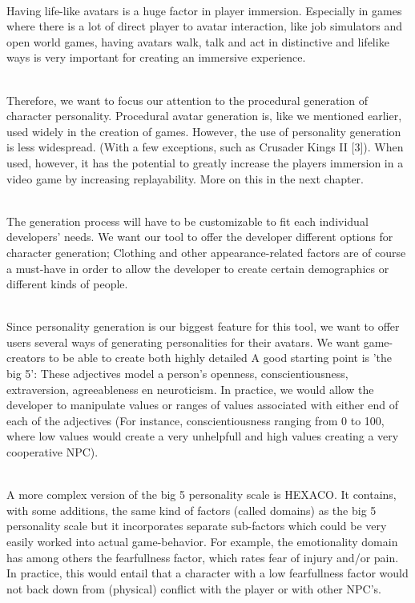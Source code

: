 \documentclass[11pt]{article}
\begin{document}
~\\
Having life-like avatars is a huge factor in player immersion. Especially in games where there is a lot of direct player to avatar interaction, like job simulators and open world games, having avatars walk, talk and act in distinctive and lifelike ways is very important for creating an immersive experience. 

~\\
Therefore, we want to focus our attention to the procedural generation of character personality. Procedural avatar generation is, like we mentioned earlier, used widely in the creation of games. However, the use of personality generation is less widespread. (With a few exceptions, such as Crusader Kings II [3]). When used, however, it has the potential to greatly increase the players immersion in a video game by increasing replayability. More on this in the next chapter.

~\\
The generation process will have to be customizable to fit each individual developers' needs. We want our tool to offer the developer different options for character generation; Clothing and other appearance-related factors are of course a must-have in order to allow the developer to create certain demographics or different kinds of people. 

~\\
Since personality generation is our biggest feature for this tool, we want to offer users several ways of generating personalities for their avatars. We want game-creators to be able to create both highly detailed A good starting point is 'the big 5': These adjectives model a person's openness, conscientiousness, extraversion, agreeableness en neuroticism. In practice, we would allow the developer to manipulate values or ranges of values associated with either end of each of the adjectives (For instance, conscientiousness ranging from 0 to 100, where low values would create a very unhelpfull and high values creating a very cooperative NPC).

~\\
A more complex version of the big 5 personality scale is HEXACO. It contains, with some additions, the same kind of factors (called domains) as the big 5 personality scale but it incorporates separate sub-factors which could be very easily worked into actual game-behavior. For example, the emotionality domain has among others the fearfullness factor, which rates fear of injury and/or pain. In practice, this would entail that a character with a low fearfullness factor would not back down from (physical) conflict with the player or with other NPC's.
\end{document}
